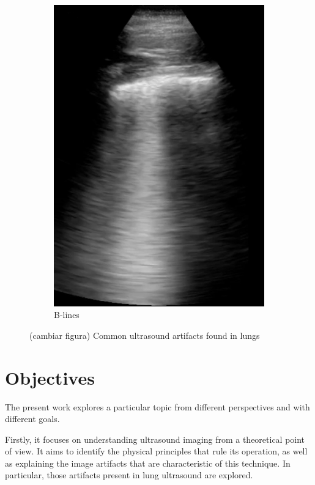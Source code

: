 \documentclass[11pt]{article} %
\begin{document}
\begin{figure}
\begin{subfigure}{0.3\textwidth}
		\includegraphics[width=\textwidth]{figuras/blines.jpg}
		\caption{B-lines}
		\end{subfigure}	
	\caption{\color{red} (cambiar figura) Common ultrasound artifacts found in lungs}	
	\end{figure}
	


\section{Objectives}

	The present work explores a particular topic from different perspectives and with different goals.

	Firstly, it focuses on understanding ultrasound imaging from a theoretical point of view. It aims to identify the physical principles that rule its operation, as well as explaining the image artifacts that are characteristic of this technique. In particular, those artifacts present in lung ultrasound are explored.
	
\end{document}
